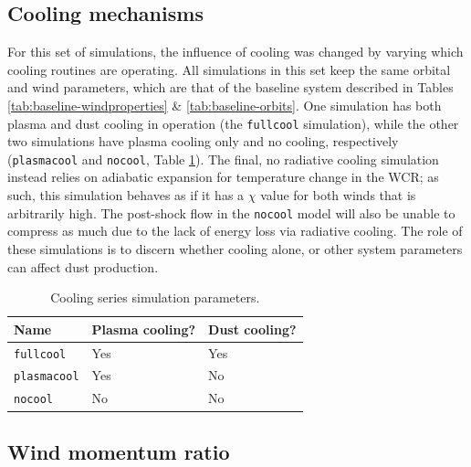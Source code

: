 \subsection{Cooling mechanisms}

For this set of simulations, the influence of cooling was changed by varying which cooling routines are operating.
All simulations in this set keep the same orbital and wind parameters, which are that of the baseline system described in Tables \ref{tab:baseline-windproperties} \& \ref{tab:baseline-orbits}.
One simulation has both plasma and dust cooling in operation (the \texttt{fullcool} simulation), while the other two simulations have plasma cooling only and no cooling, respectively (\texttt{plasmacool} and \texttt{nocool}, Table \ref{tab:cooling-param}).
The final, no radiative cooling simulation instead relies on adiabatic expansion for temperature change in the WCR; as such, this simulation behaves as if it has a $\chi$ value for both winds that is arbitrarily high.
The post-shock flow in the \texttt{nocool} model will also be unable to compress as much due to the lack of energy loss via radiative cooling.
The role of these simulations is to discern whether cooling alone, or other system parameters can affect dust production.


\begin{table}
  \centering
  \begin{tabular}{lll}
    \hline
    Name & Plasma cooling? & Dust cooling? \\
    \hline
    \texttt{fullcool} & Yes & Yes \\ 
    \texttt{plasmacool} & Yes & No \\
    \texttt{nocool} & No & No \\
    \hline
  \end{tabular}
  \caption{Cooling series simulation parameters.}
  \label{tab:cooling-param}
\end{table}

\subsection{Wind momentum ratio}

